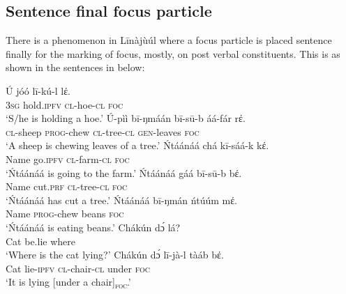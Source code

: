 \documentclass[output=paper,colorlinks,citecolor=brown]{langscibook}
\begin{document}
\subsection{Sentence final focus particle}\label{sec:bisilki:5.3}

There is a phenomenon in Līnàjùúl where a focus particle is placed sentence finally for the marking of focus, mostly, on post verbal constituents. This is as shown in the sentences in  below:

\ea%
    \label{ex:bisilki:17}
    \ea\label{ex:bisilki:17a}
    \gll    Ú	jóó		lī-kú-l		lέ.\\
            \textsc{3sg}	hold\textsc{.ipfv}	\textsc{cl-}hoe\textsc{-cl}	\textsc{foc}\\
    \glt    ‘S/he is holding a hoe.’
    \ex\label{ex:bisilki:17b}
    \gll    Ú-pìì	bī-ŋmáán	bī-sū-b		áá-fár		rέ.\\
            \textsc{cl-}sheep	\textsc{prog-}chew	\textsc{cl-}tree\textsc{-cl}	\textsc{gen-}leaves	\textsc{foc}\\
    \glt    ‘A sheep is chewing leaves of a tree.’
    \ex\label{ex:bisilki:17c}
    \gll    Ńtáánáá	chá		kī-sáá-k		kέ.\\
            Name		go\textsc{.ipfv}	\textsc{cl-}farm\textsc{-cl}		\textsc{foc}\\
    \glt    ‘Ńtáánáá is going to the farm.’
    \ex\label{ex:bisilki:17d}
    \gll    Ńtáánáá	gáá		bī-sū-b	bέ.\\
            Name		cut\textsc{.prf}	\textsc{cl-}tree\textsc{-cl}	\textsc{foc}\\
    \glt    ‘Ńtáánáá has cut a tree.’
    \ex\label{ex:bisilki:17e}
    \gll    Ńtáánáá	bī-ŋmán	ńtúúm			mέ.\\
            Name		\textsc{prog-}chew	beans			\textsc{foc}\\
    \glt    ‘Ńtáánáá is eating beans.’
    \ex\label{ex:bisilki:17f}
        \ea\label{ex:bisilki:17fi}
        \gll    Chákún	dɔ́		lá?\\
                Cat		be.lie		where\\
        \glt    ‘Where is the cat lying?’
        \ex\label{ex:bisilki:17fii}
        \gll    Chákún	dɔ́		lī-jà-l		tàáb	bέ.\\
            Cat		lie\textsc{-ipfv}	\textsc{cl-}chair\textsc{-cl}	under	\textsc{foc}\\
        \glt    ‘It is lying [under a chair]\textsubscript{\textsc{foc}}.’
        \z
    \z
\z
\end{document}
